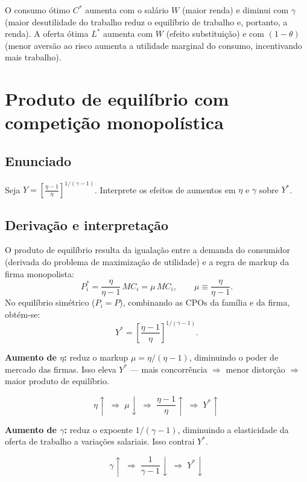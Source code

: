 \documentclass[12pt, a4paper]{article}
\begin{document}
\begin{provabox}[title={Intuição econômica}]
O consumo ótimo $C^*$ aumenta com o salário $W$ (maior renda) e diminui com $\gamma$
(maior desutilidade do trabalho reduz o equilíbrio de trabalho e, portanto, a renda).
A oferta ótima $L^*$ aumenta com $W$ (efeito substituição) e com $(1-\theta)$
(menor aversão ao risco aumenta a utilidade marginal do consumo, incentivando mais trabalho).
\end{provabox}

\section{Produto de equilíbrio com competição monopolística}

\subsection*{Enunciado}
Seja $Y = \left[\tfrac{\eta-1}{\eta}\right]^{1/(\gamma-1)}$. Interprete os efeitos de
aumentos em $\eta$ e $\gamma$ sobre $Y^*$.

\subsection*{Derivação e interpretação}

O produto de equilíbrio resulta da igualação entre a demanda do consumidor (derivada
do problema de maximização de utilidade) e a regra de markup da firma monopolista:
\[
P_i^* = \frac{\eta}{\eta-1}\,MC_i = \mu\,MC_i, \qquad \mu \equiv \frac{\eta}{\eta-1}.
\]
No equilíbrio simétrico ($P_i = P$), combinando as CPOs da família e da firma,
obtém-se:
\[
Y^* = \left[\frac{\eta-1}{\eta}\right]^{1/(\gamma-1)}.
\]

\begin{resultbox}[title={Efeitos de $\eta$ e $\gamma$}]
\textbf{Aumento de $\eta$:} reduz o markup $\mu = \eta/(\eta-1)$, diminuindo o poder
de mercado das firmas. Isso eleva $Y^*$ --- mais concorrência $\Rightarrow$ menor
distorção $\Rightarrow$ maior produto de equilíbrio.

\[
\eta \uparrow \;\Rightarrow\; \mu \downarrow \;\Rightarrow\; \frac{\eta-1}{\eta} \uparrow
\;\Rightarrow\; Y^* \uparrow
\]

\textbf{Aumento de $\gamma$:} reduz o expoente $1/(\gamma-1)$, diminuindo a
elasticidade da oferta de trabalho a variações salariais. Isso contrai $Y^*$.

\[
\gamma \uparrow \;\Rightarrow\; \frac{1}{\gamma-1} \downarrow \;\Rightarrow\; Y^* \downarrow
\]
\end{resultbox}
\end{document}
